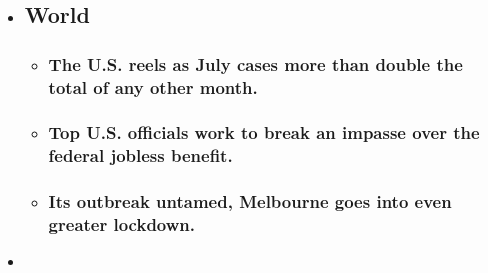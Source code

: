 \begin{itemize}
\item
  \href{https://www.nytimes3xbfgragh.onion/2020/08/01/world/coronavirus-covid-19.html?type=styln-live-updates\&label=world\&index=0}{}

  \hypertarget{world}{%
  \subsection{World}\label{world}}

  \begin{itemize}
  \item
    \href{https://www.nytimes3xbfgragh.onion/2020/08/01/world/coronavirus-covid-19.html?type=styln-live-updates\&label=world\&index=0\#link-34047410}{}

    \hypertarget{the-us-reels-as-july-cases-more-than-double-the-total-of-any-other-month}{%
    \subsubsection{The U.S. reels as July cases more than double the
    total of any other
    month.}\label{the-us-reels-as-july-cases-more-than-double-the-total-of-any-other-month}}
  \item
    \href{https://www.nytimes3xbfgragh.onion/2020/08/01/world/coronavirus-covid-19.html?type=styln-live-updates\&label=world\&index=0\#link-780ec966}{}

    \hypertarget{top-us-officials-work-to-break-an-impasse-over-the-federal-jobless-benefit}{%
    \subsubsection{Top U.S. officials work to break an impasse over the
    federal jobless
    benefit.}\label{top-us-officials-work-to-break-an-impasse-over-the-federal-jobless-benefit}}
  \item
    \href{https://www.nytimes3xbfgragh.onion/2020/08/01/world/coronavirus-covid-19.html?type=styln-live-updates\&label=world\&index=0\#link-2bc8948}{}

    \hypertarget{its-outbreak-untamed-melbourne-goes-into-even-greater-lockdown}{%
    \subsubsection{Its outbreak untamed, Melbourne goes into even
    greater
    lockdown.}\label{its-outbreak-untamed-melbourne-goes-into-even-greater-lockdown}}
  \end{itemize}
\item
  \href{https://www.nytimes3xbfgragh.onion/live/2020/07/31/business/stock-market-today-coronavirus?type=styln-live-updates\&label=business\&index=1}{}


\end{itemize}
